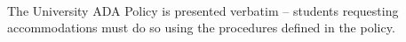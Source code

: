 \documentclass[12pt]{article}
\begin{document}
\begin{thebibliography}{}
~\\The University ADA Policy is presented verbatim -- students requesting accommodations must do so using the procedures defined in the policy.




\end{thebibliography}
\end{document}
